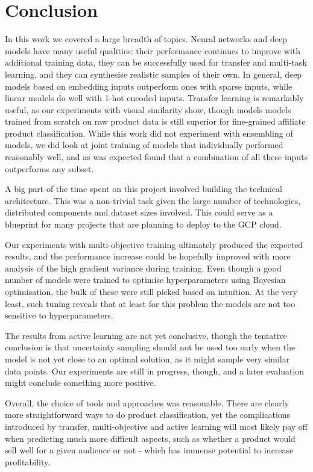 \chapter{Conclusion}
\label{sum}

In this work we covered a large breadth of topics.
Neural networks and deep models have many useful qualities: their performance continues to improve with additional training data, they can be successfully used for transfer and multi-task learning, and they can synthesise realistic samples of their own.
In general, deep models based on embedding inputs outperform ones with sparse inputs, while linear models do well with 1-hot encoded inputs.
Transfer learning is remarkably useful, as our experiments with visual similarity show, though models models trained from scratch on raw product data is still superior for fine-grained affiliate product classification.
While this work did not experiment with ensembling of models, we did look at joint training of models that individually performed reasonably well, and as was expected found that a combination of all these inputs outperforms any subset.

A big part of the time spent on this project involved building the technical architecture.
This was a non-trivial task given the large number of technologies, distributed components and dataset sizes involved.
This could serve as a blueprint for many projects that are planning to deploy to the GCP cloud.

Our experiments with multi-objective training ultimately produced the expected results, and the performance increase could be hopefully improved with more analysis of the high gradient variance during training.
Even though a good number of models were trained to optimise hyperparameters using Bayesian optimisation, the bulk of these were still picked based on intuition.
At the very least, such tuning reveals that at least for this problem the models are not too sensitive to hyperparameters.

The results from active learning are not yet conclusive, though the tentative conclusion is that uncertainty sampling should not be used too early when the model is not yet close to an optimal solution, as it might sample very similar data points.
Our experiments are still in progress, though, and a later evaluation might conclude something more positive.

Overall, the choice of tools and approaches was reasonable.
There are clearly more straightforward ways to do product classification, yet the complications introduced by transfer, multi-objective and active learning will most likely pay off when predicting much more difficult aspects, such as whether a product would sell well for a given audience or not - which has immense potential to increase profitability.
